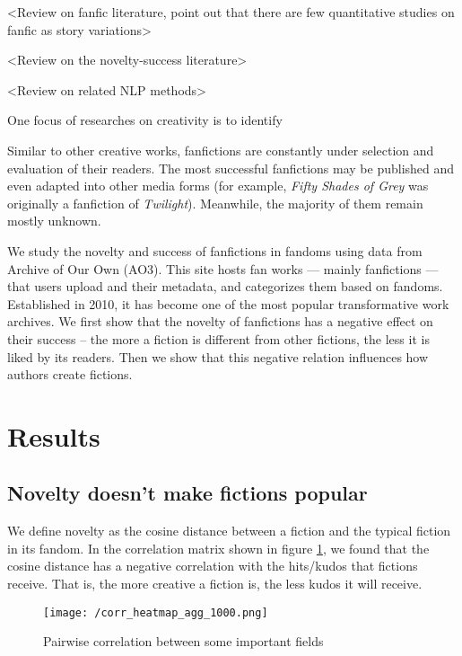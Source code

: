 \documentclass[a4paper]{article}
\begin{document}
<Review on fanfic literature, point out that there are few quantitative studies on fanfic as story variations>

<Review on the novelty-success literature>

<Review on related NLP methods>

One focus of researches on creativity is to identify 


Similar to other creative works, fanfictions are constantly under selection and evaluation of their readers. The most successful fanfictions may be published and even adapted into other media forms (for example, \emph{Fifty Shades of Grey} was originally a fanfiction of \emph{Twilight}). Meanwhile, the majority of them remain mostly unknown.

We study the novelty and success of fanfictions in fandoms using data from Archive of Our Own (AO3). This site hosts fan works --- mainly fanfictions --- that users upload and their metadata, and categorizes them based on fandoms. Established in 2010, it has become one of the most popular transformative work archives. We first show that the novelty of fanfictions has a negative effect on their success -- the more a fiction is different from other fictions, the less it is liked by its readers. Then we show that this negative relation influences how authors create fictions.


\section{Results} %
\label{sec:results}
\subsection{Novelty doesn't make fictions popular}
We define novelty as the cosine distance between a fiction and the typical fiction in its fandom. In the correlation matrix shown in figure \ref{fig:corr_heatmap}, we found that the cosine distance has a negative correlation with the hits/kudos that fictions receive. That is, the more creative a fiction is, the less kudos it will receive.

\begin{figure}[htbp]
\begin{center}
\texttt{[image: /corr\_heatmap\_agg\_1000.png]}
\caption{Pairwise correlation between some important fields }
\label{fig:corr_heatmap}
\end{center}
\end{figure}
\end{document}
